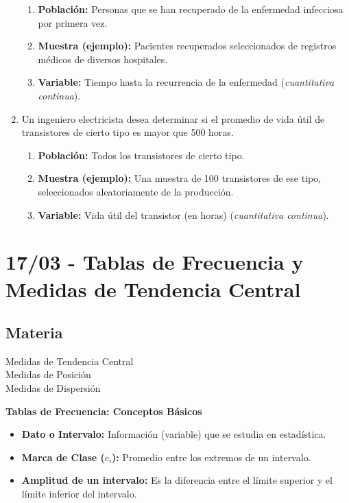 \documentclass[12pt, letterpaper]{article}
\begin{document}
\begin{enumerate}
        \begin{enumerate}
            \item \textbf{Población:} Personas que se han recuperado de la enfermedad infecciosa por primera vez.
            \item \textbf{Muestra (ejemplo):} Pacientes recuperados seleccionados de registros médicos de diversos hospitales.
            \item \textbf{Variable:} Tiempo hasta la recurrencia de la enfermedad (\textit{cuantitativa continua}).
        \end{enumerate}
    \item Un ingeniero electricista desea determinar si el promedio de vida útil de transistores de cierto tipo es mayor que 500 horas.
        \begin{enumerate}
            \item \textbf{Población:} Todos los transistores de cierto tipo.
            \item \textbf{Muestra (ejemplo):} Una muestra de 100 transistores de ese tipo, seleccionados aleatoriamente de la producción.
            \item \textbf{Variable:} Vida útil del transistor (en horas) (\textit{cuantitativa continua}).
        \end{enumerate}
\end{enumerate}
\newpage

\section{17/03 - Tablas de Frecuencia y Medidas de Tendencia Central}
\subsection{Materia}
Medidas de Tendencia Central \\
Medidas de Posición \\
Medidas de Dispersión 

\textbf{Tablas de Frecuencia: Conceptos Básicos}
\begin{itemize}
    \item \textbf{Dato o Intervalo:} Información (variable) que se estudia en estadística.
    \item \textbf{Marca de Clase ($c_i$):} Promedio entre los extremos de un intervalo.
    \item \textbf{Amplitud de un intervalo:} Es la diferencia entre el límite superior y el límite inferior del intervalo.
\end{itemize}
\end{document}
